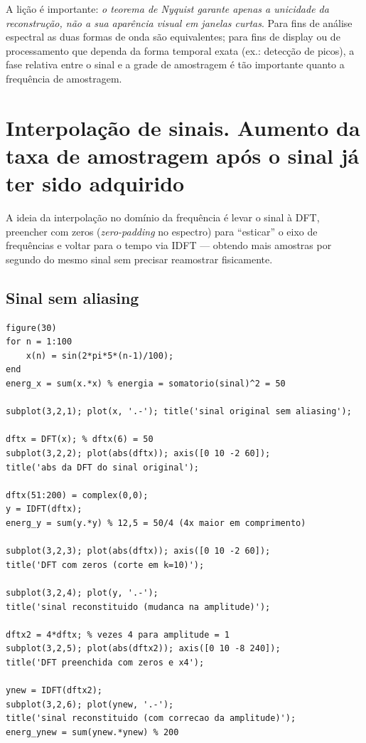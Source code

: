 \documentclass[12pt]{article}
\begin{document}
A lição é importante: \emph{o teorema de Nyquist garante apenas a unicidade da reconstrução, não a sua aparência visual em janelas curtas}. Para fins de análise espectral as duas formas de onda são equivalentes; para fins de display ou de processamento que dependa da forma temporal exata (ex.: detecção de picos), a fase relativa entre o sinal e a grade de amostragem é tão importante quanto a frequência de amostragem.

\clearpage
\section{Interpolação de sinais. Aumento da taxa de amostragem após o sinal já ter sido adquirido}

A ideia da interpolação no domínio da frequência é levar o sinal à DFT, preencher com zeros (\textit{zero-padding} no espectro) para ``esticar'' o eixo de frequências e voltar para o tempo via IDFT — obtendo mais amostras por segundo do mesmo sinal sem precisar reamostrar fisicamente.

\subsection{Sinal sem aliasing}

\begin{lstlisting}
figure(30)
for n = 1:100
    x(n) = sin(2*pi*5*(n-1)/100);
end
energ_x = sum(x.*x) % energia = somatorio(sinal)^2 = 50

subplot(3,2,1); plot(x, '.-'); title('sinal original sem aliasing');

dftx = DFT(x); % dftx(6) = 50
subplot(3,2,2); plot(abs(dftx)); axis([0 10 -2 60]);
title('abs da DFT do sinal original');

dftx(51:200) = complex(0,0);
y = IDFT(dftx);
energ_y = sum(y.*y) % 12,5 = 50/4 (4x maior em comprimento)

subplot(3,2,3); plot(abs(dftx)); axis([0 10 -2 60]);
title('DFT com zeros (corte em k=10)');

subplot(3,2,4); plot(y, '.-');
title('sinal reconstituido (mudanca na amplitude)');

dftx2 = 4*dftx; % vezes 4 para amplitude = 1
subplot(3,2,5); plot(abs(dftx2)); axis([0 10 -8 240]);
title('DFT preenchida com zeros e x4');

ynew = IDFT(dftx2);
subplot(3,2,6); plot(ynew, '.-');
title('sinal reconstituido (com correcao da amplitude)');
energ_ynew = sum(ynew.*ynew) % 200
\end{lstlisting}
\end{document}
